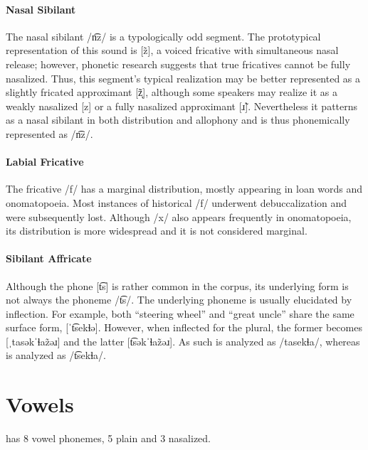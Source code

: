 \paragraph{Nasal Sibilant}
The nasal sibilant /n͡z/ is a typologically odd segment. The prototypical representation of this sound is [z̃], a voiced fricative with simultaneous nasal release; however, phonetic research suggests that true fricatives cannot be fully nasalized. Thus, this segment's typical realization may be better represented as a slightly fricated approximant [z̞̃], although some speakers may realize it as a weakly nasalized [z] or a fully nasalized approximant [ɹ̃]. Nevertheless it patterns as a nasal sibilant in both distribution and allophony and is thus phonemically represented as /n͡z/.

\paragraph{Labial Fricative}
The fricative /f/ has a marginal distribution, mostly appearing in loan words and onomatopoeia. Most instances of historical /f/ underwent debuccalization and were subsequently lost. Although /x/ also appears frequently in onomatopoeia, its distribution is more widespread and it is not considered marginal.

\paragraph{Sibilant Affricate}
Although the phone [t͡s] is rather common in the corpus, its underlying form is not always the phoneme /t͡s/.  The underlying phoneme is usually elucidated by inflection. For example, both  “steering wheel” and  “great uncle” share the same surface form, [ˈt͡sekɬə]. However, when inflected for the plural, the former becomes [ˌtasəkˈɬaz̃əɹ] and the latter [t͡səkˈɬaz̃əɹ]. As such  is analyzed as /tasekɬa/, whereas  is analyzed as /t͡sekɬa/.

\section{Vowels}
\langname{} has 8 vowel phonemes, 5 plain and 3 nasalized. 

